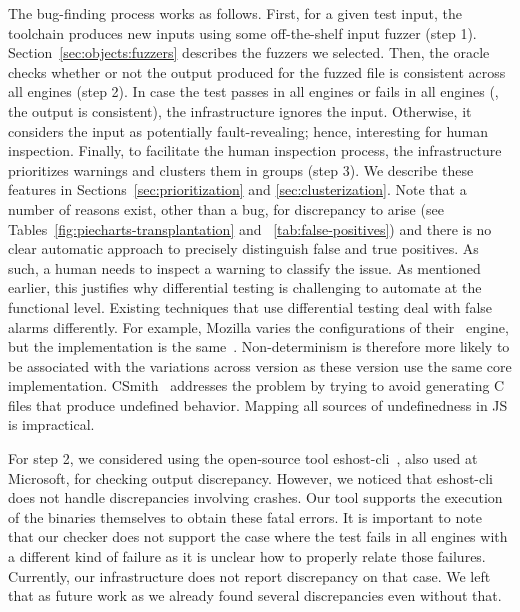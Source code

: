 \documentclass[smallextended]{svjour3}
\begin{document}
The bug-finding process works as follows. First, for a given test
input, the toolchain produces new inputs using some off-the-shelf
input fuzzer (step 1). Section~\ref{sec:objects:fuzzers} describes the
fuzzers we selected. Then, the oracle checks whether or not the output
produced for the fuzzed file is consistent across all engines (step
2). In case the test passes in all engines or fails in all engines
(\ie{}, the output is consistent), the infrastructure ignores the
input. Otherwise, it considers the input as potentially
fault-revealing; hence, interesting for human inspection. Finally, to
facilitate the human inspection process, the infrastructure
prioritizes warnings and clusters them in groups (step 3). We describe
these features in Sections~\ref{sec:prioritization} and
\ref{sec:clusterization}. Note that a number of reasons exist, other
than a bug, for discrepancy to arise (see
Tables~\ref{fig:piecharts-transplantation} and
~\ref{tab:false-positives}) and there is no clear automatic approach
to precisely distinguish false and true positives. As such, a human
needs to inspect a warning to classify the issue. As mentioned
earlier, this justifies why differential testing is challenging to
automate at the functional level. Existing techniques that use
differential testing deal with false alarms differently. For example,
Mozilla varies the configurations of their \smonkey\ engine, but the
implementation is the same~\cite{mozilla-severity}. Non-determinism is
therefore more likely to be associated with the variations across
version as these version use the same core
implementation. CSmith~\cite{Yang:2011:FUB:1993498.1993532} addresses
the problem by trying to avoid generating C files that produce
undefined behavior. Mapping all sources of undefinedness in JS is
impractical.


For step 2, we considered using the open-source tool
eshost-cli~\cite{eshost-cli}, also used at Microsoft, for checking
output discrepancy. However, we noticed that eshost-cli does not
handle discrepancies involving crashes. Our tool supports the execution of the
binaries themselves to obtain these fatal errors.
It is important to note that our checker does not support the case where
the test fails in all engines with a different kind of failure as it
is unclear how to properly relate those failures. Currently, our
infrastructure does not report discrepancy on that case. We left that
as future work as we already found several discrepancies even without
that.
\end{document}
